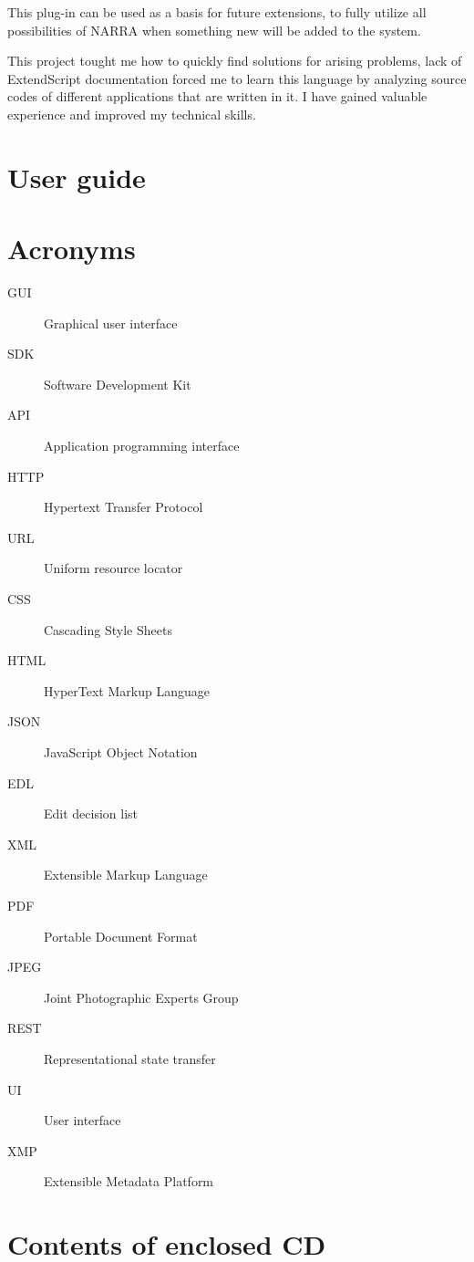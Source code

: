 \documentclass[thesis=B,english]{FITthesis}[2012/10/20]
\begin{document}
This plug-in can be used as a basis for future extensions, to fully utilize all possibilities of NARRA when something new will be added to the system. 

This project tought me how to quickly find solutions for arising problems, lack of ExtendScript documentation forced me to learn this language by analyzing source codes of different applications that are written in it. I have gained valuable experience and improved my technical skills.




\appendix

\chapter{User guide}


\chapter{Acronyms}
\begin{description}
	\item[GUI] Graphical user interface
	\item[SDK] Software Development Kit
	\item[API] Application programming interface
	\item[HTTP] Hypertext Transfer Protocol
	\item[URL] Uniform resource locator
	\item[CSS] Cascading Style Sheets
	\item[HTML] HyperText Markup Language
	\item[JSON] JavaScript Object Notation
	\item[EDL] Edit decision list
	\item[XML] Extensible Markup Language
	\item[PDF] Portable Document Format
	\item[JPEG] Joint Photographic Experts Group
	\item[REST] Representational state transfer
	\item[UI] User interface
	\item[XMP] Extensible Metadata Platform
\end{description}


\chapter{Contents of enclosed CD}


\begin{figure}
\end{figure}
\end{document}
